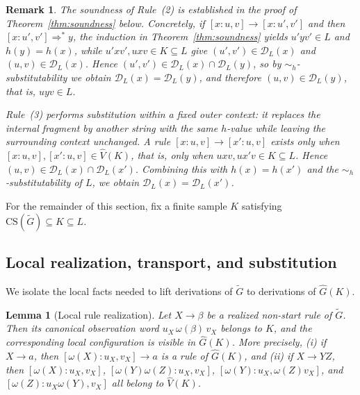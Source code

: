 \documentclass[11pt,a4paper]{article}
\newtheorem{lemma}[theorem]{Lemma}
\newtheorem{remark}[theorem]{Remark}
\newcommand{\D}{\mathcal{D}}
\newcommand{\CS}{\mathrm{CS}}
\begin{document}
\begin{remark}
The soundness of Rule~\textup{(2)} is established in the proof of
Theorem~\ref{thm:soundness} below. Concretely, if
$[x:u,v]\to[x:u',v']$ and then $[x:u',v']\Rightarrow^* y$, the induction in
Theorem~\ref{thm:soundness} yields $u'yv'\in L$ and $h(y)=h(x)$, while
$u'xv',uxv\in K\subseteq L$ give $(u',v')\in\D_L(x)$ and $(u,v)\in\D_L(x)$.
Hence $(u',v')\in\D_L(x)\cap\D_L(y)$, so by $\sim_h$-substitutability we obtain
$\D_L(x)=\D_L(y)$, and therefore $(u,v)\in\D_L(y)$, that is, $uyv\in L$.

Rule~\textup{(3)} performs substitution within a fixed outer context: it replaces the internal fragment by another string with the same $h$-value while leaving the surrounding context unchanged. A rule $[x:u,v]\to[x':u,v]$ exists only when $[x:u,v],[x':u,v]\in\hat V(K)$, that is, only when $uxv,ux'v\in K\subseteq L$. Hence $(u,v)\in\D_L(x)\cap\D_L(x')$. Combining this with $h(x)=h(x')$ and the $\sim_h$-substitutability of $L$, we obtain $\D_L(x)=\D_L(x')$.
\end{remark}

For the remainder of this section, fix a finite sample $K$ satisfying $\CS(\widetilde G)\subseteq K\subseteq L$.

\subsection{Local realization, transport, and substitution}

We isolate the local facts needed to lift derivations of $\widetilde G$ to derivations of $\hat G(K)$.

\begin{lemma}[Local rule realization]
\label{lem:local-rule-realization}
Let $X\to\beta$ be a realized non-start rule of $\widetilde G$. Then its canonical observation word $u_X\,\omega(\beta)\,v_X$ belongs to $K$, and the corresponding local configuration is visible in $\hat G(K)$. More precisely, \textup{(i)} if $X\to a$, then $[\omega(X):u_X,v_X]\to a$ is a rule of $\hat G(K)$, and \textup{(ii)} if $X\to YZ$, then $[\omega(X):u_X,v_X]$, $[\omega(Y)\omega(Z):u_X,v_X]$, $[\omega(Y):u_X,\omega(Z)v_X]$, and $[\omega(Z):u_X\omega(Y),v_X]$ all belong to $\hat V(K)$.
\end{lemma}
\end{document}
